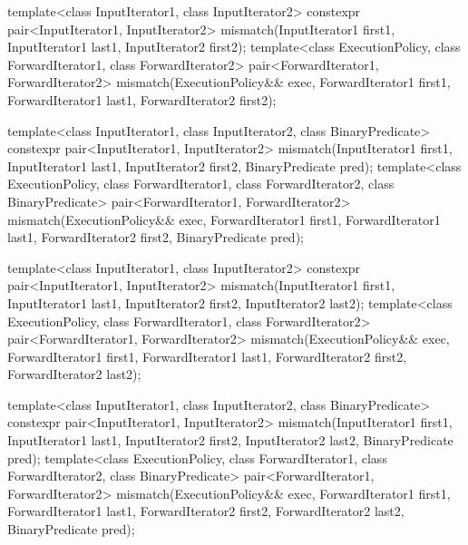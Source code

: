 %
\begin{itemdecl}
template<class InputIterator1, class InputIterator2>
  constexpr pair<InputIterator1, InputIterator2>
    mismatch(InputIterator1 first1, InputIterator1 last1,
             InputIterator2 first2);
template<class ExecutionPolicy, class ForwardIterator1, class ForwardIterator2>
  pair<ForwardIterator1, ForwardIterator2>
    mismatch(ExecutionPolicy&& exec,
             ForwardIterator1 first1, ForwardIterator1 last1,
             ForwardIterator2 first2);

template<class InputIterator1, class InputIterator2,
         class BinaryPredicate>
  constexpr pair<InputIterator1, InputIterator2>
    mismatch(InputIterator1 first1, InputIterator1 last1,
             InputIterator2 first2, BinaryPredicate pred);
template<class ExecutionPolicy, class ForwardIterator1, class ForwardIterator2,
         class BinaryPredicate>
  pair<ForwardIterator1, ForwardIterator2>
    mismatch(ExecutionPolicy&& exec,
             ForwardIterator1 first1, ForwardIterator1 last1,
             ForwardIterator2 first2, BinaryPredicate pred);

template<class InputIterator1, class InputIterator2>
  constexpr pair<InputIterator1, InputIterator2>
    mismatch(InputIterator1 first1, InputIterator1 last1,
             InputIterator2 first2, InputIterator2 last2);
template<class ExecutionPolicy, class ForwardIterator1, class ForwardIterator2>
  pair<ForwardIterator1, ForwardIterator2>
    mismatch(ExecutionPolicy&& exec,
             ForwardIterator1 first1, ForwardIterator1 last1,
             ForwardIterator2 first2, ForwardIterator2 last2);

template<class InputIterator1, class InputIterator2,
         class BinaryPredicate>
  constexpr pair<InputIterator1, InputIterator2>
    mismatch(InputIterator1 first1, InputIterator1 last1,
             InputIterator2 first2, InputIterator2 last2,
             BinaryPredicate pred);
template<class ExecutionPolicy, class ForwardIterator1, class ForwardIterator2,
         class BinaryPredicate>
  pair<ForwardIterator1, ForwardIterator2>
    mismatch(ExecutionPolicy&& exec,
             ForwardIterator1 first1, ForwardIterator1 last1,
             ForwardIterator2 first2, ForwardIterator2 last2,
             BinaryPredicate pred);


\end{itemdecl}
